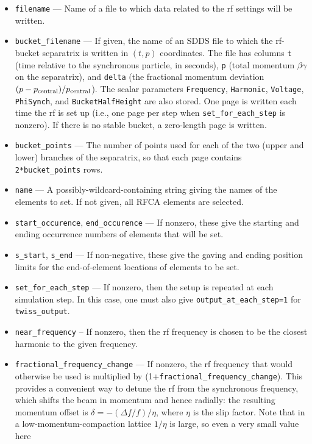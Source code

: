\documentclass[11pt]{article}
\begin{document}
\begin{itemize}
\item \verb|filename| --- Name of a file to which data related to the rf settings will be written.
\item \verb|bucket_filename| --- If given, the name of an SDDS file to which the rf-bucket separatrix is
  written in $(t,p)$ coordinates.  The file has columns \verb|t| (time relative to the synchronous particle, in
  seconds), \verb|p| (total momentum $\beta\gamma$ on the separatrix), and \verb|delta| (the fractional momentum
  deviation $(p-p_{\rm central})/p_{\rm central}$).  The scalar parameters \verb|Frequency|, \verb|Harmonic|,
  \verb|Voltage|, \verb|PhiSynch|, and \verb|BucketHalfHeight| are also stored.  One page is written each time the
  rf is set up (i.e., one page per step when \verb|set_for_each_step| is nonzero).  If there is no stable bucket, a zero-length page
  is written.
\item \verb|bucket_points| --- The number of points used for each of the two (upper and lower) branches of the
  separatrix, so that each page contains \verb|2*bucket_points| rows.
\item \verb|name| --- A possibly-wildcard-containing string giving the names of the
        elements to set.  If not given, all RFCA elements are selected.
\item \verb|start_occurence|, \verb|end_occurence| --- If nonzero, these give the starting and
 ending occurrence numbers of elements that will be set. 
\item \verb|s_start|, \verb|s_end| --- If non-negative, these give the gaving and ending position
 limits for the end-of-element locations of elements to be set.
\item \verb|set_for_each_step| --- If nonzero, then the setup is repeated at each simulation step.
  In this case, one must also give \verb|output_at_each_step=1| for \verb|twiss_output|.
\item \verb|near_frequency| -- If nonzero, then the rf frequency is chosen to be the closest harmonic
  to the given frequency.
\item \verb|fractional_frequency_change| --- If nonzero, the rf frequency that would otherwise be
  used is multiplied by (1+\verb|fractional_frequency_change|).  This provides a convenient way to
  detune the rf from the synchronous frequency, which shifts the beam in momentum and hence radially:
  the resulting momentum offset is $\delta = -(\Delta f/f)/\eta$, where $\eta$ is the slip factor.
  Note that in a low-momentum-compaction lattice $1/\eta$ is large, so even a very small value here

\end{itemize}
\end{document}
